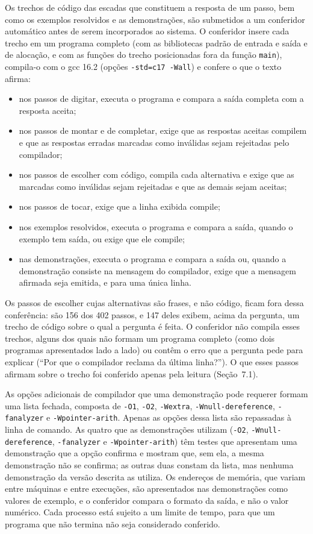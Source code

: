 Os trechos de código das escadas que constituem a resposta de um passo, bem como os exemplos resolvidos e as demonstrações, são submetidos a um conferidor automático antes de serem incorporados ao sistema. O conferidor insere cada trecho em um programa completo (com as bibliotecas padrão de entrada e saída e de alocação, e com as funções do trecho posicionadas fora da função \texttt{main}), compila-o com o gcc 16.2 (opções \texttt{-{}std=c17 -{}Wall}) e confere o que o texto afirma:

\begin{itemize}
\item nos passos de digitar, executa o programa e compara a saída completa com a resposta aceita;
\item nos passos de montar e de completar, exige que as respostas aceitas compilem e que as respostas erradas marcadas como inválidas sejam rejeitadas pelo compilador;
\item nos passos de escolher com código, compila cada alternativa e exige que as marcadas como inválidas sejam rejeitadas e que as demais sejam aceitas;
\item nos passos de tocar, exige que a linha exibida compile;
\item nos exemplos resolvidos, executa o programa e compara a saída, quando o exemplo tem saída, ou exige que ele compile;
\item nas demonstrações, executa o programa e compara a saída ou, quando a demonstração consiste na mensagem do compilador, exige que a mensagem afirmada seja emitida, e para uma única linha.
\end{itemize}

Os passos de escolher cujas alternativas são frases, e não código, ficam fora dessa conferência: são 156 dos 402 passos, e 147 deles exibem, acima da pergunta, um trecho de código sobre o qual a pergunta é feita. O conferidor não compila esses trechos, alguns dos quais não formam um programa completo (como dois programas apresentados lado a lado) ou contêm o erro que a pergunta pede para explicar (``Por que o compilador reclama da última linha?''). O que esses passos afirmam sobre o trecho foi conferido apenas pela leitura (Seção~7.1).

As opções adicionais de compilador que uma demonstração pode requerer formam uma lista fechada, composta de \texttt{-{}O1}, \texttt{-{}O2}, \texttt{-{}Wextra}, \texttt{-{}Wnull-{}dereference}, \texttt{-{}fanalyzer} e \texttt{-{}Wpointer-{}arith}. Apenas as opções dessa lista são repassadas à linha de comando. As quatro que as demonstrações utilizam (\texttt{-{}O2}, \texttt{-{}Wnull-{}dereference}, \texttt{-{}fanalyzer} e \texttt{-{}Wpointer-{}arith}) têm testes que apresentam uma demonstração que a opção confirma e mostram que, sem ela, a mesma demonstração não se confirma; as outras duas constam da lista, mas nenhuma demonstração da versão descrita as utiliza. Os endereços de memória, que variam entre máquinas e entre execuções, são apresentados nas demonstrações como valores de exemplo, e o conferidor compara o formato da saída, e não o valor numérico. Cada processo está sujeito a um limite de tempo, para que um programa que não termina não seja considerado conferido.

